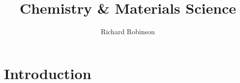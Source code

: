 \documentclass{tufte-book}
\title{Chemistry \& Materials Science}
\author{Richard Robinson}
\begin{document}
\frontmatter
\maketitle
\tableofcontents

\setlength{\parindent}{0pt}

\mainmatter



\chapter{Introduction}
\end{document}
